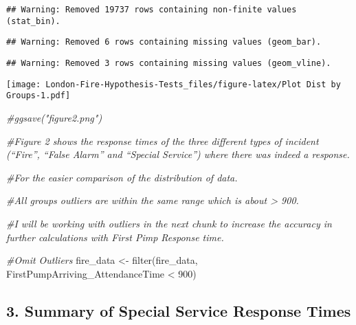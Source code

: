 \documentclass[
]{article}
\newenvironment{Shaded}{\begin{snugshade}}{\end{snugshade}}
\newcommand{\CommentTok}[1]{\textcolor[rgb]{0.56,0.35,0.01}{\textit{#1}}}
\newcommand{\DecValTok}[1]{\textcolor[rgb]{0.00,0.00,0.81}{#1}}
\newcommand{\FunctionTok}[1]{\textcolor[rgb]{0.00,0.00,0.00}{#1}}
\newcommand{\NormalTok}[1]{#1}
\newcommand{\OtherTok}[1]{\textcolor[rgb]{0.56,0.35,0.01}{#1}}
\newcommand{\SpecialCharTok}[1]{\textcolor[rgb]{0.00,0.00,0.00}{#1}}
\begin{document}
\begin{verbatim}
## Warning: Removed 19737 rows containing non-finite values (stat_bin).
\end{verbatim}

\begin{verbatim}
## Warning: Removed 6 rows containing missing values (geom_bar).
\end{verbatim}

\begin{verbatim}
## Warning: Removed 3 rows containing missing values (geom_vline).
\end{verbatim}

\texttt{[image: London-Fire-Hypothesis-Tests\_files/figure-latex/Plot Dist by Groups-1.pdf]}

\begin{Shaded}
\begin{Highlighting}[]
\CommentTok{\#ggsave("figure2.png")}

\CommentTok{\#Figure 2 shows the response times of the three different types of incident (“Fire”, “False Alarm” and “Special Service”) where there was indeed a response.}

\CommentTok{\#For the easier comparison of the distribution of data.}

\CommentTok{\#All group\textquotesingle{}s outliers are within the same range which is about \textgreater{} 900.}

\CommentTok{\#I will be working with outliers in the next chunk to increase the accuracy in further calculations with First Pimp Response time.}
\end{Highlighting}
\end{Shaded}

\begin{Shaded}
\begin{Highlighting}[]
\CommentTok{\#Omit Outliers}
\NormalTok{fire\_data }\OtherTok{\textless{}{-}} \FunctionTok{filter}\NormalTok{(fire\_data, FirstPumpArriving\_AttendanceTime }\SpecialCharTok{\textless{}} \DecValTok{900}\NormalTok{)}
\end{Highlighting}
\end{Shaded}

\hypertarget{summary-of-special-service-response-times}{%
\subsection{3. Summary of Special Service Response
Times}\label{summary-of-special-service-response-times}}
\end{document}
